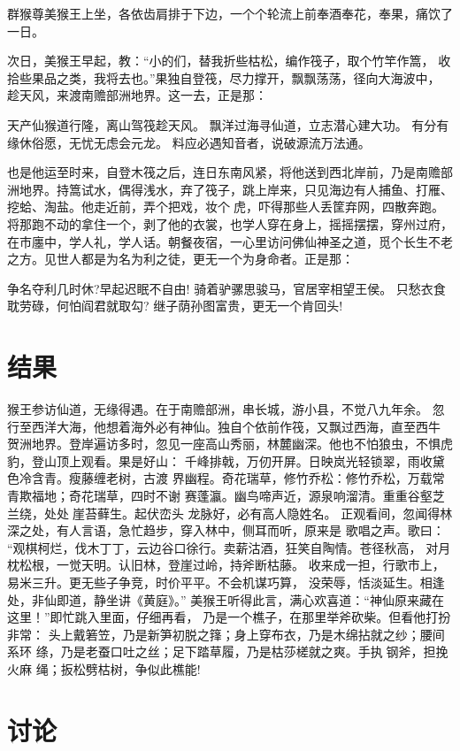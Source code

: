 \documentclass[]{style/zjuthesis}
\begin{document}
群猴尊美猴王上坐，各依齿肩排于下边，一个个轮流上前奉酒奉花，奉果，痛饮了
一日。

次日，美猴王早起，教：``小的们，替我折些枯松，编作筏子，取个竹竿作篙，
收拾些果品之类，我将去也。''果独自登筏，尽力撑开，飘飘荡荡，径向大海波中，
趁天风，来渡南赡部洲地界。这一去，正是那：

天产仙猴道行隆，离山驾筏趁天风。 飘洋过海寻仙道，立志潜心建大功。
有分有缘休俗愿，无忧无虑会元龙。 料应必遇知音者，说破源流万法通。

也是他运至时来，自登木筏之后，连日东南风紧，将他送到西北岸前，乃是南赡部
洲地界。持篙试水，偶得浅水，弃了筏子，跳上岸来，只见海边有人捕鱼、打雁、
挖蛤、淘盐。他走近前，弄个把戏，妆个虎，吓得那些人丢筐弃网，四散奔跑。
将那跑不动的拿住一个，剥了他的衣裳，也学人穿在身上，摇摇摆摆，穿州过府，
在市廛中，学人礼，学人话。朝餐夜宿，一心里访问佛仙神圣之道，觅个长生不老
之方。见世人都是为名为利之徒，更无一个为身命者。正是那：

争名夺利几时休?早起迟眠不自由! 骑着驴骡思骏马，官居宰相望王侯。
只愁衣食耽劳碌，何怕阎君就取勾? 继子荫孙图富贵，更无一个肯回头!

\chapter{结果}

猴王参访仙道，无缘得遇。在于南赡部洲，串长城，游小县，不觉八九年余。
忽行至西洋大海，他想着海外必有神仙。独自个依前作筏，又飘过西海，直至西牛
贺洲地界。登岸遍访多时，忽见一座高山秀丽，林麓幽深。他也不怕狼虫，不惧虎
豹，登山顶上观看。果是好山：
千峰排戟，万仞开屏。日映岚光轻锁翠，雨收黛色冷含青。瘦藤缠老树，古渡
界幽程。奇花瑞草，修竹乔松：修竹乔松，万载常青欺福地；奇花瑞草，四时不谢
赛蓬瀛。幽鸟啼声近，源泉响溜清。重重谷壑芝兰绕，处处崖苔藓生。起伏峦头
龙脉好，必有高人隐姓名。
正观看间，忽闻得林深之处，有人言语，急忙趋步，穿入林中，侧耳而听，原来是
歌唱之声。歌曰：
``观棋柯烂，伐木丁丁，云边谷口徐行。卖薪沽酒，狂笑自陶情。苍径秋高，
对月枕松根，一觉天明。认旧林，登崖过岭，持斧断枯藤。
收来成一担，行歌市上，易米三升。更无些子争竞，时价平平。不会机谋巧算，
没荣辱，恬淡延生。相逢处，非仙即道，静坐讲《黄庭》。''
美猴王听得此言，满心欢喜道：``神仙原来藏在这里！''即忙跳入里面，仔细再看，
乃是一个樵子，在那里举斧砍柴。但看他打扮非常：
头上戴箬笠，乃是新笋初脱之箨；身上穿布衣，乃是木绵拈就之纱；腰间系环
绦，乃是老蚕口吐之丝；足下踏草履，乃是枯莎槎就之爽。手执钢斧，担挽火麻
绳；扳松劈枯树，争似此樵能!

\chapter{讨论}
\end{document}
